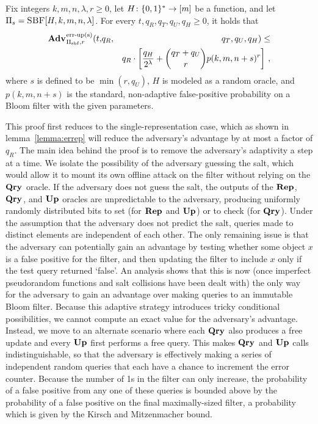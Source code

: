 
\begin{theorem}\label{thm:bf-priv-salt-bound}
Fix integers $k, m, n, \lambda, r\geq 0$, let $H \colon \{0,1\}^* \to [m]$ be a function, and let $\mathrm{\Pi}_s = \textnormal{\textsc{SBF}}[H,k,m,n,\lambda]$.
  For every $t, q_R, q_T, q_U, q_H \geq 0$, it holds that
  \begin{eqnarray*}
    \Adv{\erreps}_{\struct_\saltybloom,r}(t,&q_R,& q_T, q_U, q_H) \leq \\ && q_R \cdot
     \left[
      \frac{q_H}{2^\lambda} +
      {\dbinom{q_T+q_U}{r}} p(k, m, n+s)^r
    \right] \,,
\end{eqnarray*}
where $s$ is defined to be $\min(r,q_U)$, $H$ is modeled as a random oracle, and $p(k, m, n+s)$ is the standard, non-adaptive false-positive probability on a Bloom filter with the given parameters.
\end{theorem}

This proof first reduces to the single-representation case, which as shown in
lemma~\ref{lemma:errep} will reduce the adversary's advantage by at most a
factor of $q_R$. The main idea behind the proof is to remove the adversary's
adaptivity a step at a time. We isolate the possibility of the adversary
guessing the salt, which would allow it to mount its own offline attack on the
filter without relying on the $\textup{\textbf{Qry}}\hspace{0.5pt}$ oracle. If the adversary does not guess
the salt, the outputs of the $\textup{\textbf{Rep}}\hspace{0.5pt}$, $\textup{\textbf{Qry}}\hspace{0.5pt}$, and $\textup{\textbf{Up}}\hspace{0.5pt}$ oracles are
unpredictable to the adversary, producing uniformly randomly distributed bits to
set (for $\textup{\textbf{Rep}}\hspace{0.5pt}$ and $\textup{\textbf{Up}}\hspace{0.5pt}$) or to check (for $\textup{\textbf{Qry}}\hspace{0.5pt}$). Under the assumption
that the adversary does not predict the salt, queries made to distinct elements
are independent of each other. The only remaining issue is that the adversary
can potentially gain an advantage by testing whether some object $x$ is a false
positive for the filter, and then updating the filter to include $x$ only if the
test query returned `false'. An analysis shows that this is now (once imperfect
pseudorandom functions and salt collisions have been dealt with) the only way
for the adversary to gain an advantage over making queries to an immutable Bloom
filter. Because this adaptive strategy introduces tricky conditional
possibilities, we cannot compute an exact value for the adversary's advantage.
Instead, we move to an alternate scenario where each $\textup{\textbf{Qry}}\hspace{0.5pt}$ also produces a
free update and every $\textup{\textbf{Up}}\hspace{0.5pt}$ first performs a free query. This makes $\textup{\textbf{Qry}}\hspace{0.5pt}$ and
$\textup{\textbf{Up}}\hspace{0.5pt}$ calls indistinguishable, so that the adversary is effectively making a
series of independent random queries that each have a chance to increment the
error counter. Because the number of 1s in the filter can only increase, the
probability of a false positive from any one of these queries is bounded above
by the probability of a false positive on the final maximally-sized filter, a
probability which is given by the Kirsch and Mitzenmacher bound.

